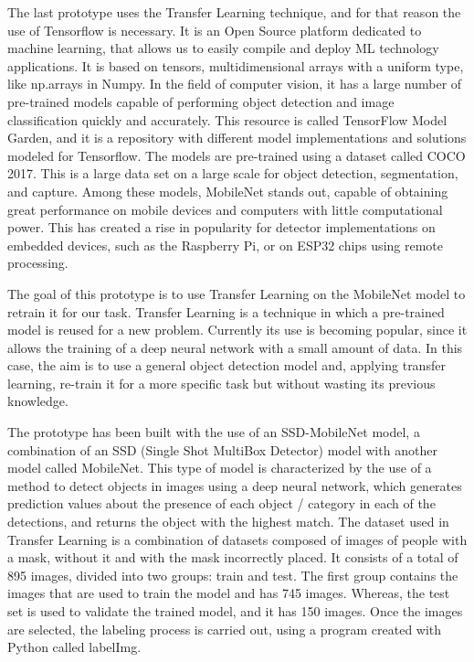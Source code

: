 The last prototype uses the Transfer Learning technique, and for that reason the use of Tensorflow is necessary. It is an Open Source platform dedicated to machine learning, that allows us to easily compile and deploy ML technology applications. It is based on tensors, multidimensional arrays with a uniform type, like np.arrays in Numpy. In the field of computer vision, it has a large number of pre-trained models capable of performing object detection and image classification quickly and accurately. This resource is called TensorFlow Model Garden, and it is a repository with different model implementations and solutions modeled for Tensorflow. The models are pre-trained using a dataset called COCO 2017. This is a large data set on a large scale for object detection, segmentation, and capture. Among these models, MobileNet stands out, capable of obtaining great performance on mobile devices and computers with little computational power. This has created a rise in popularity for detector implementations on embedded devices, such as the Raspberry Pi, or on ESP32 chips using remote processing.

The goal of this prototype is to use Transfer Learning on the MobileNet model to retrain it for our task. Transfer Learning is a technique in which a pre-trained model is reused for a new problem. Currently its use is becoming popular, since it allows the training of a deep neural network with a small amount of data. In this case, the aim is to use a general object detection model and, applying transfer learning, re-train it for a more specific task but without wasting its previous knowledge. 

The prototype has been built with the use of an SSD-MobileNet model, a combination of an SSD (Single Shot MultiBox Detector) model with another model called MobileNet. This type of model is characterized by the use of a method to detect objects in images using a deep neural network, which generates prediction values about the presence of each object / category in each of the detections, and returns the object with the highest match. The dataset used in Transfer Learning is a combination of datasets composed of images of people with a mask, without it and with the mask incorrectly placed. It consists of a total of 895 images, divided into two groups: train and test. The first group contains the images that are used to train the model and has 745 images. Whereas, the test set is used to validate the trained model, and it has 150 images. Once the images are selected, the labeling process is carried out, using a program created with Python called labelImg. 

